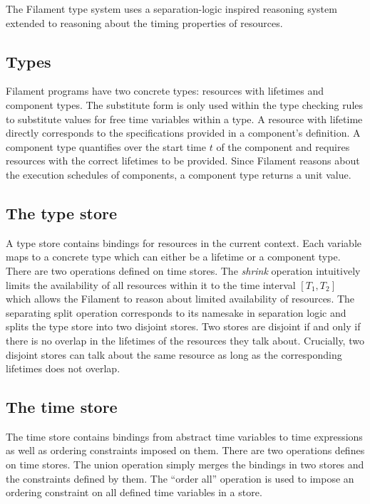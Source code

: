 \documentclass[acmsmall,review,anonymous]{acmart}
\begin{document}

The Filament type system uses a separation-logic inspired reasoning system
extended to reasoning about the timing properties of resources.

\subsection{Types}

Filament programs have two concrete types: resources with lifetimes and component
types.
The substitute form is only used within the type checking rules to substitute
values for free time variables within a type.
A resource with lifetime directly corresponds to the specifications provided
in a component's definition.
A component type quantifies over the start time $t$ of the component and requires
resources with the correct lifetimes to be provided.
Since Filament reasons about the execution schedules of components, a component
type returns a unit value.


\subsection{The type store}

A type store contains bindings for resources in the current context.
Each variable maps to a concrete type which can either be a lifetime or a
component type.
There are two operations defined on time stores.
The \emph{shrink} operation intuitively limits the availability of all
resources within it to the time interval $[T_1, T_2]$ which allows the Filament
to reason about limited availability of resources.
The separating split operation corresponds to its namesake in separation logic
and splits the type store into two disjoint stores.
Two stores are disjoint if and only if there is no overlap in the lifetimes of the
resources they talk about.
Crucially, two disjoint stores can talk about the same resource as long as the
corresponding lifetimes does not overlap.

\subsection{The time store}

The time store contains bindings from abstract time variables to time
expressions as well as ordering constraints imposed on them.
There are two operations defines on time stores.
The union operation simply merges the bindings in two stores and the constraints
defined by them.
The ``order all'' operation is used to impose an ordering constraint on all
defined time variables in a store.
\end{document}
